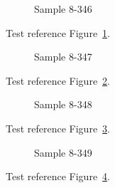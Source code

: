 \begin{figure}[tbhp]
\caption{Sample 8-346}
\label{fig:sample-8-346}
\end{figure}

Test reference Figure~\ref{fig:sample-8-346}.

\begin{figure}[tbhp]
\caption{Sample 8-347}
\label{fig:sample-8-347}
\end{figure}

Test reference Figure~\ref{fig:sample-8-347}.

\begin{figure}[tbhp]
\caption{Sample 8-348}
\label{fig:sample-8-348}
\end{figure}

Test reference Figure~\ref{fig:sample-8-348}.

\begin{figure}[tbhp]
\caption{Sample 8-349}
\label{fig:sample-8-349}
\end{figure}

Test reference Figure~\ref{fig:sample-8-349}.

